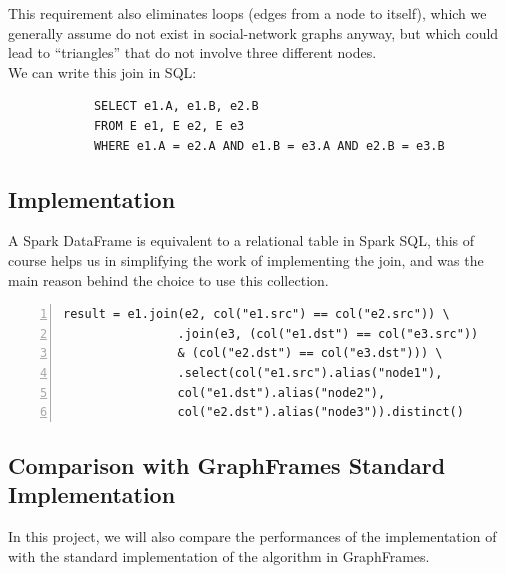 \documentclass[a4paper,11pt, twoside]{article}
\begin{document}
        This requirement also eliminates loops (edges from a node to itself), which we generally assume do not exist in social-network graphs anyway, but which could lead to “triangles” that do not involve three different nodes.\\
        We can write this join in SQL:
        
        \begin{verbatim}
            SELECT e1.A, e1.B, e2.B
            FROM E e1, E e2, E e3
            WHERE e1.A = e2.A AND e1.B = e3.A AND e2.B = e3.B
        \end{verbatim}
    
        \subsection{Implementation}
        A Spark DataFrame is equivalent to a relational table in Spark SQL, this of course helps us in simplifying the work of implementing the join, and was the main reason behind the choice to use this collection.
    
        \begin{lstlisting}[backgroundcolor=\color{backcolour},   
                            commentstyle=\color{codegreen},
                            keywordstyle=\color{magenta},
                            numberstyle=\tiny\color{codegray},
                            stringstyle=\color{codepurple},
                            basicstyle=\ttfamily\footnotesize,
                            breakatwhitespace=false,         
                            breaklines=true,                 
                            captionpos=b,                    
                            keepspaces=true,                 
                            numbers=left,                    
                            numbersep=5pt,                  
                            showspaces=false,                
                            showstringspaces=false,
                            showtabs=false,                  
                            tabsize=1]
        result = e1.join(e2, col("e1.src") == col("e2.src")) \
                .join(e3, (col("e1.dst") == col("e3.src")) 
                & (col("e2.dst") == col("e3.dst"))) \
                .select(col("e1.src").alias("node1"), 
                col("e1.dst").alias("node2"), 
                col("e2.dst").alias("node3")).distinct()
        \end{lstlisting}
        
        \subsection{Comparison with GraphFrames Standard Implementation}
        In this project, we will also compare the performances of the implementation of \cite{10.5555/2787930} with the standard implementation of the algorithm in GraphFrames. \cite{trianglecount}
    
\end{document}

